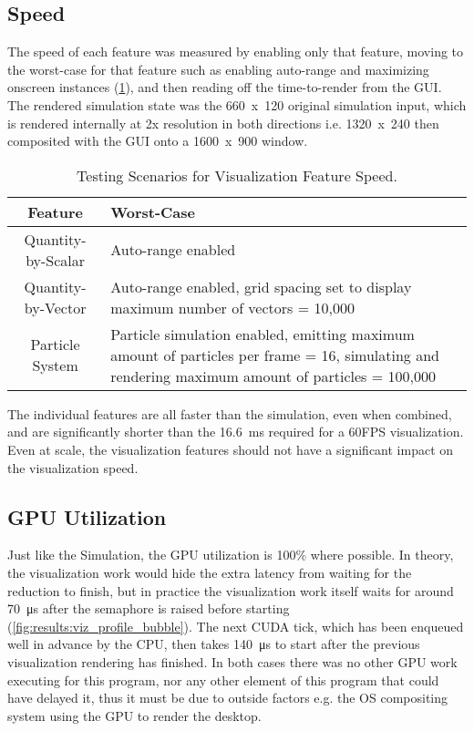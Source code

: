 \subsection{Speed}\label{sec:Results:Viz:Speed}
The speed of each feature was measured by enabling only that feature, moving to the worst-case for that feature such as enabling auto-range and maximizing onscreen instances (\cref{tab:results:vizworstcases}), and then reading off the time-to-render from the GUI.
The rendered simulation state was the 660~x~120 original simulation input, which is rendered internally at 2x resolution in both directions i.e. 1320~x~240 then composited with the GUI onto a 1600~x~900 window.

\begin{table}[]
    \centering
    \begin{tabular}{c|p{}}
        Feature & Worst-Case \\
        \hline
        Quantity-by-Scalar & Auto-range enabled \\
        Quantity-by-Vector & Auto-range enabled, grid spacing set to display maximum number of vectors = 10,000 \\
        Particle System & Particle simulation enabled, emitting maximum amount of particles per frame = 16, simulating and rendering maximum amount of particles = 100,000 \\
    \end{tabular}
    \caption{Testing Scenarios for Visualization Feature Speed.}
    \label{tab:results:vizworstcases}
\end{table}



The individual features are all faster than the simulation, even when combined, and are significantly shorter than the \SI{16.6}{\milli\second} required for a 60FPS visualization.
Even at scale, the visualization features should not have a significant impact on the visualization speed.

\subsection{GPU Utilization}\label{sec:Results:Viz:Efficiency}

Just like the Simulation, the GPU utilization is 100\% where possible.
In theory, the visualization work would hide the extra latency from waiting for the reduction to finish, but in practice the visualization work itself waits for around \SI{70}{\micro\second} after the semaphore is raised before starting (\cref{fig:results:viz_profile_bubble}).
The next CUDA tick, which has been enqueued well in advance by the CPU, then takes \SI{140}{\micro\second} to start after the previous visualization rendering has finished.
In both cases there was no other GPU work executing for this program, nor any other element of this program that could have delayed it, thus it must be due to outside factors e.g. the OS compositing system using the GPU to render the desktop.


